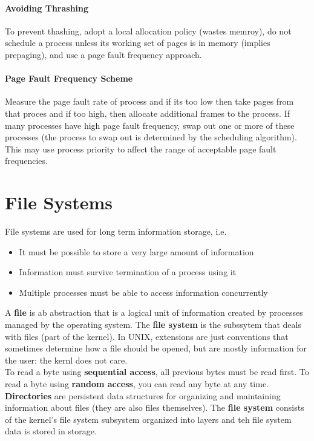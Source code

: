 \documentclass{article}
\newcommand{\bold}[1]{\textbf{#1}}
\renewcommand{\b}{\item[$\circ$]}
\newcommand{\newlist}{\begin{itemize}}
\renewcommand{\endlist}{\end{itemize}}
\begin{document}
\paragraph{Avoiding Thrashing}

To prevent thashing, adopt a local allocation policy (wastes memroy), do not schedule a process unless its working set of pages is in memory (implies prepaging), and use a page fault frequency approach. 

\paragraph{Page Fault Frequency Scheme}

Measure the page fault rate of process and if its too low then take pages from that proces and if too high, then allocate additional frames to the process. If many processes have high page fault frequency, swap out one or more of these processes (the process to swap out is determined by the scheduling algorithm). This may use process priority to affect the range of acceptable page fault frequencies. 

\newpage 
\section{File Systems}

File systems are used for long term information storage, i.e.

\newlist 
\b It must be possible to store a very large amount of information
\b Information must survive termination of a process using it
\b Multiple processes must be able to access information concurrently
\endlist 

A \bold{file} is ab abstraction that is a logical unit of information created by processes managed by the operating system. The \bold{file system} is the subssytem that deals with files (part of the kernel). In UNIX, extensions are just conventions that sometimes determine how a file should be opened, but are mostly information for the user: the kernl does not care. \\ 

To read a byte using \bold{sequential access}, all previous bytes must be read first. To read a byte using \bold{random access}, you can read any byte at any time. \\ 

\bold{Directories} are persistent data structures for organizing and maintaining information about files (they are also files themselves). The \bold{file system} consists of the kernel's file system subsystem organized into layers and teh file system data is stored in storage. 
\end{document}
